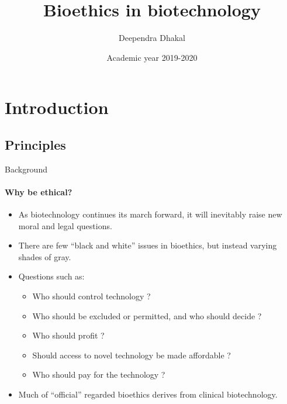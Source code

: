 \documentclass[ignorenonframetext,aspectratio=169]{beamer}
\title{Bioethics in biotechnology}
\author{Deependra Dhakal}
\institute{GAASC, Baitadi \and Tribhuwan University}
\date{Academic year 2019-2020}
\providecommand{\tightlist}{%
  \setlength{\itemsep}{0pt}\setlength{\parskip}{0pt}}
\begin{document}
\frame{\titlepage}

\begin{frame}
\tableofcontents[hideallsubsections]
\end{frame}
\hypertarget{introduction}{%
\section{Introduction}\label{introduction}}

\hypertarget{principles}{%
\subsection{Principles}\label{principles}}

\begin{frame}{Background}
\protect\hypertarget{background}{}

\framesubtitle{Why be ethical?}

\begin{itemize}
\tightlist
\item
  As biotechnology continues its march forward, it will inevitably raise
  new moral and legal questions.
\item
  There are few ``black and white'' issues in bioethics, but instead
  varying shades of gray.
\item
  Questions such as:

  \begin{itemize}
  \tightlist
  \item
    Who should control technology ?
  \item
    Who should be excluded or permitted, and who should decide ?
  \item
    Who should profit ?
  \item
    Should access to novel technology be made affordable ?
  \item
    Who should pay for the technology ?
  \end{itemize}
\item
  Much of ``official'' regarded bioethics derives from clinical
  biotechnology.
\end{itemize}

\end{frame}
\end{document}
